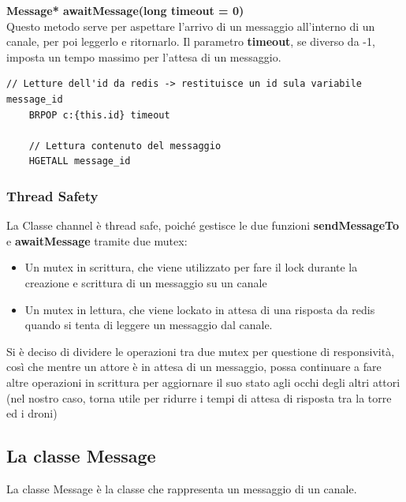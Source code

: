 \documentclass[a4paper, 11pt]{article}
\begin{document}
\textbf{Message* awaitMessage(long timeout = 0)}\\
Questo metodo serve per aspettare l'arrivo di un messaggio all'interno di un canale, per poi leggerlo e ritornarlo.
Il parametro \textbf{timeout}, se diverso da -1, imposta un tempo massimo per l'attesa di un messaggio.
\begin{lstlisting}[style=customcpp]
    // Letture dell'id da redis -> restituisce un id sula variabile message_id
    BRPOP c:{this.id} timeout

    // Lettura contenuto del messaggio
    HGETALL message_id
\end{lstlisting}
\subsubsection{Thread Safety}

La Classe channel è thread safe, poiché gestisce le due funzioni \textbf{sendMessageTo} e \textbf{awaitMessage} tramite due mutex:
\begin{itemize}
    \item Un mutex in scrittura, che viene utilizzato per fare il lock durante la creazione e scrittura di un messaggio su un canale
    \item Un mutex in lettura, che viene lockato in attesa di una risposta da redis quando si tenta di leggere un messaggio dal canale.
\end{itemize}

Si è deciso di dividere le operazioni tra due mutex per questione di responsività, così che mentre un attore è in attesa di un messaggio,
possa continuare a fare altre operazioni in scrittura per aggiornare il suo stato agli occhi degli altri attori (nel nostro caso, 
torna utile per ridurre i tempi di attesa di risposta tra la torre ed i droni)
\newpage
\subsection{La classe Message}
La classe Message è la classe che rappresenta un messaggio di un canale.
\end{document}
